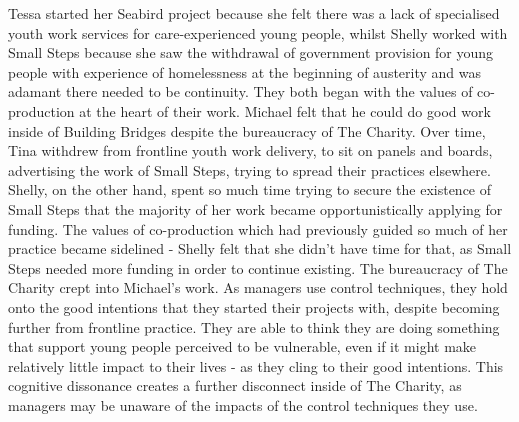 Tessa started her Seabird project because she felt there was a lack of specialised youth work services for care-experienced young people, whilst Shelly worked with Small Steps because she saw the withdrawal of government provision for young people with experience of homelessness at the beginning of austerity and was adamant there needed to be continuity. They both began with the values of co-production at the heart of their work. Michael felt that he could do good work inside of Building Bridges despite the bureaucracy of The Charity. Over time, Tina withdrew from frontline youth work delivery, to sit on panels and boards, advertising the work of Small Steps, trying to spread their practices elsewhere. Shelly, on the other hand, spent so much time trying to secure the existence of Small Steps that the majority of her work became opportunistically applying for funding. The values of co-production which had previously guided so much of her practice became sidelined - Shelly felt that she didn't have time for that, as Small Steps needed more funding in order to continue existing. The bureaucracy of The Charity crept into Michael's work. As managers use control techniques, they hold onto the good intentions that they started their projects with, despite becoming further from frontline practice. They are able to think they are doing something that support young people perceived to be vulnerable, even if it might make relatively little impact to their lives - as they cling to their good intentions. This cognitive dissonance creates a further disconnect inside of The Charity, as managers may be unaware of the impacts of the control techniques they use. 







